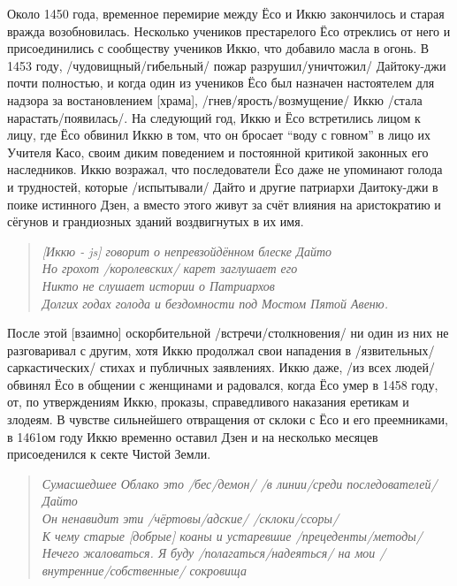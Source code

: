 \begin{ver}
Около 1450 года, временное перемирие между Ёсо и Иккю закончилось и
старая вражда возобновилась. Несколько учеников престарелого Ёсо
отреклись от него и присоединились с сообществу учеников Иккю, что
добавило масла в огонь. В 1453 году, /чудовищный/гибельный/ пожар
разрушил/уничтожил/ Дайтоку-джи почти полностью, и когда один из
учеников Ёсо был назначен настоятелем для надзора за востановлением
[храма], /гнев/ярость/возмущение/ Иккю /стала нарастать/появилась/.
На следующий год, Иккю и Ёсо встретились лицом к лицу, где Ёсо обвинил
Иккю в том, что он бросает ``воду с говном'' в лицо их Учителя Касо,
своим диким поведением и постоянной критикой законных его наследников.
Иккю возражал, что последователи Ёсо даже не упоминают голода и
трудностей, которые /испытывали/ Дайто и другие патриархи Даитоку-джи
в поике истинного Дзен, а вместо этого живут за счёт влияния на
аристократию и сёгунов и грандиозных зданий воздвигнутых в их имя.
\end{ver}

\begin{ver}
  \begin{verse}\it
    [Иккю - js] говорит о непревзойдённом блеске Дайто\\
    Но грохот /королевских/ карет заглушает его\\
    Никто не слушает истории о Патриархов\\
    Долгих годах голода и бездомности под Мостом Пятой Авеню.
  \end{verse}
\end{ver}

\begin{ver}
  После этой [взаимно] оскорбительной /встречи/столкновения/ ни один
  из них не разговаривал с другим, хотя Иккю продолжал свои нападения
  в /язвительных/саркастических/ стихах и публичных заявлениях. Иккю
  даже, /из всех людей/ обвинял Ёсо в общении с женщинами и радовался,
  когда Ёсо умер в 1458 году, от, по утверждениям Иккю, проказы,
  справедливого наказания еретикам и злодеям. В чувстве
  сильнейшего отвращения от склоки с Ёсо и его преемниками, в 1461ом
  году Иккю временно оставил Дзен и на несколько месяцев присоеденился
  к секте Чистой Земли. 
\end{ver}

\begin{ver}
  \begin{verse}\it
    Сумасшедшее Облако это /бес/демон/ /в линии/среди последователей/
    Дайто\\
    Он ненавидит эти /чёртовы/адские/ /склоки/ссоры/\\
    К чему старые [добрые] коаны и устаревшие /прецеденты/методы/\\
    Нечего жаловаться. Я буду /полагаться/надеяться/ на мои
    /внутренние/собственные/ сокровища\\
  \end{verse}
\end{ver}

